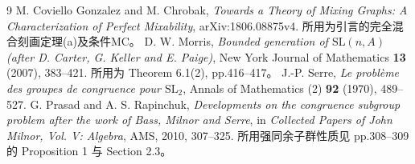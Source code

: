 \documentclass[11pt,a4paper]{article}
\theoremstyle{definition}
\numberwithin{equation}{section}
\begin{document}
\begin{thebibliography}{9}
 M. Coviello Gonzalez and M. Chrobak,
\emph{Towards a Theory of Mixing Graphs: A Characterization of Perfect Mixability},
arXiv:1806.08875v4. 所用为引言的完全混合刻画定理(a)及条件MC。
 D. W. Morris,
\emph{Bounded generation of $\mathrm{SL}(n,A)$ (after D. Carter, G. Keller and E. Paige)},
New York Journal of Mathematics \textbf{13} (2007), 383--421.
所用为 Theorem 6.1(2), pp.416--417。
 J.-P. Serre,
\emph{Le probl\`eme des groupes de congruence pour $\mathrm{SL}_2$},
Annals of Mathematics (2) \textbf{92} (1970), 489--527.
 G. Prasad and A. S. Rapinchuk,
\emph{Developments on the congruence subgroup problem after the work of Bass, Milnor and Serre},
in \emph{Collected Papers of John Milnor, Vol. V: Algebra}, AMS, 2010, 307--325.
所用强同余子群性质见 pp.308--309 的 Proposition 1 与 Section 2.3。
\end{thebibliography}
\end{document}
